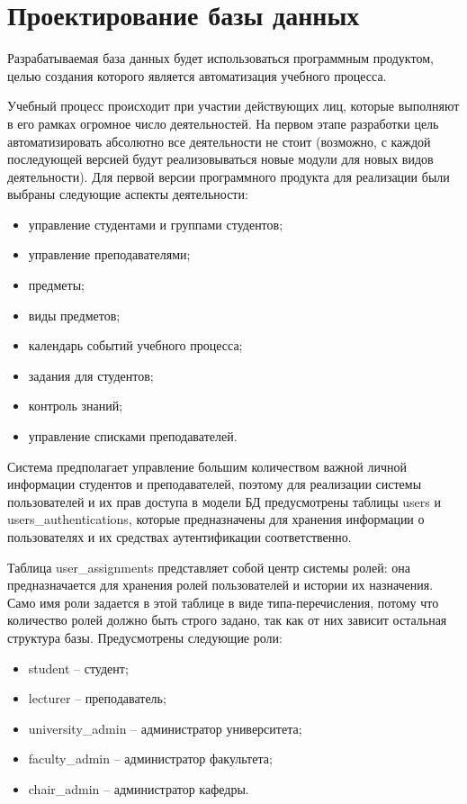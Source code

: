 \section{Проектирование базы данных}
\label{sec:db_design}

Разрабатываемая база данных будет использоваться программным продуктом, целью создания которого является автоматизация учебного процесса. 

Учебный процесс происходит при участии действующих лиц, которые выполняют в его рамках огромное число деятельностей. На первом этапе разработки цель автоматизировать абсолютно все деятельности не стоит (возможно, с каждой последующей версией будут реализовываться новые модули для новых видов деятельности). Для первой версии программного продукта для реализации были выбраны следующие аспекты деятельности:
\begin{itemize}
	\item управление студентами и группами студентов;
	\item управление преподавателями;
	\item предметы;
	\item виды предметов;
	\item календарь событий учебного процесса;
	\item задания для студентов;
	\item контроль знаний;
	\item управление списками преподавателей.
\end{itemize}

Система предполагает управление большим количеством важной личной информации студентов и преподавателей, поэтому для реализации системы пользователей и их прав доступа в модели БД предусмотрены таблицы users и users\_authentications, которые предназначены для хранения информации о пользователях и их средствах аутентификации соответственно.

Таблица user\_assignments представляет собой центр системы ролей: она предназначается для хранения ролей пользователей и истории их назначения. Само имя роли задается в этой таблице в виде типа-перечисления, потому что количество ролей должно быть строго задано, так как от них зависит остальная структура базы. Предусмотрены следующие роли:
\begin{itemize}
	\item student -- студент;
	\item lecturer -- преподаватель;
	\item university\_admin -- администратор университета;
	\item faculty\_admin -- администратор факультета;
	\item chair\_admin -- администратор кафедры.
\end{itemize}

